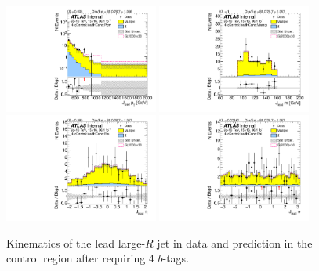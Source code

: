 \begin{figure}[htbp!]
\begin{center}
\includegraphics[width=0.45\textwidth,angle=-90]{figures/boosted/Control/b77_FourTag_Control_leadHCand_Pt_m_1.pdf}
\includegraphics[width=0.45\textwidth,angle=-90]{figures/boosted/Control/b77_FourTag_Control_leadHCand_Mass_s.pdf}\\
\includegraphics[width=0.45\textwidth,angle=-90]{figures/boosted/Control/b77_FourTag_Control_leadHCand_Eta.pdf}
\includegraphics[width=0.45\textwidth,angle=-90]{figures/boosted/Control/b77_FourTag_Control_leadHCand_Phi.pdf}
  \caption{Kinematics of the lead large-$R$ jet in data and prediction in the control region after requiring 4 $b$-tags. }
  \label{fig:boosted-4b-control-ak10-lead}
\end{center}
\end{figure}

